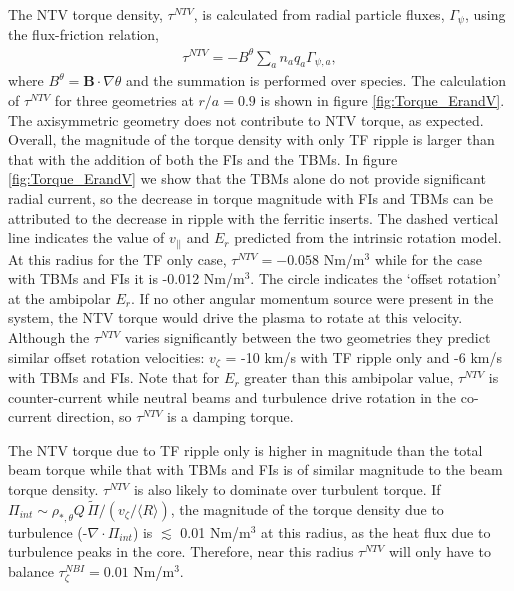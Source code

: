 \documentclass{article}
\begin{document}
The NTV torque density, $\tau^{NTV}$, is calculated from radial particle fluxes, $\Gamma_{\psi}$, using the flux-friction relation,
\begin{gather}
\tau^{NTV} = - B^{\theta} \sum_a n_a q_a \Gamma_{\psi, a},
\end{gather}
where $B^{\theta} = \bm{B} \cdot \nabla \theta$ and the summation is performed over species. The calculation of $\tau^{NTV}$ for three geometries at $r/a = 0.9$ is shown in figure \ref{fig:Torque_ErandV}. The axisymmetric geometry does not contribute to NTV torque, as expected. Overall, the magnitude of the torque density with only TF ripple is larger than that with the addition of both the FIs and the TBMs.  In figure \ref{fig:Torque_ErandV} we show that the TBMs alone do not provide significant radial current, so the decrease in torque magnitude with FIs and TBMs can be attributed to the decrease in ripple with the ferritic inserts. The dashed vertical line indicates the value of $v_{||}$ and $E_r$ predicted from the intrinsic rotation model. At this radius for the TF only case, $\tau^{NTV} = -0.058$ Nm/m$^3$ while for the case with TBMs and FIs it is -0.012 Nm/m$^3$. The circle indicates the `offset rotation' at the ambipolar $E_r$. If no other angular momentum source were present in the system, the NTV torque would drive the plasma to rotate at this velocity. Although the $\tau^{NTV}$ varies significantly between the two geometries they predict similar offset rotation velocities: $v_{\zeta}$ = -10 km/s with TF ripple only and -6 km/s with TBMs and FIs. Note that for $E_r$ greater than this ambipolar value, $\tau^{NTV}$ is counter-current while neutral beams and turbulence drive rotation in the co-current direction, so $\tau^{NTV}$ is a damping torque.

The NTV torque due to TF ripple only is higher in magnitude than the total beam torque while that with TBMs and FIs is of similar magnitude to the beam torque density. $\tau^{NTV}$ is also likely to dominate over turbulent torque. If $\Pi_{int} \sim \rho_{*, \theta} Q\, \widetilde{\Pi}/(v_{\zeta}/\langle R \rangle)$, the magnitude of the torque density due to turbulence (-$\nabla \cdot \Pi_{int}$) is $\lesssim $ 0.01 Nm/m$^3$ at this radius, as the heat flux due to turbulence peaks in the core. Therefore, near this radius $\tau^{NTV}$ will only have to balance $\tau_{\zeta}^{NBI} = 0.01$ Nm/m$^3$. 

\FloatBarrier
\end{document}
